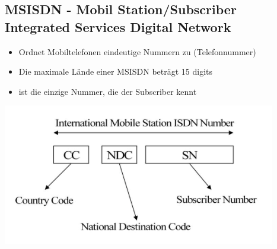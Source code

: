 \subsection{MSISDN - Mobil Station/Subscriber Integrated Services Digital Network}

\begin{minipage}{0.6 \linewidth}
\begin{itemize}
\item Ordnet Mobiltelefonen eindeutige Nummern zu (Telefonnummer)
\item Die maximale Lände einer MSISDN beträgt 15 digits
\item ist die einzige Nummer, die der Subscriber kennt
\end{itemize}
\end{minipage}
\begin{minipage}{0.4 \linewidth}
\includegraphics[width =  \linewidth]{./Pics/GSMMSISDN}
\end{minipage}

